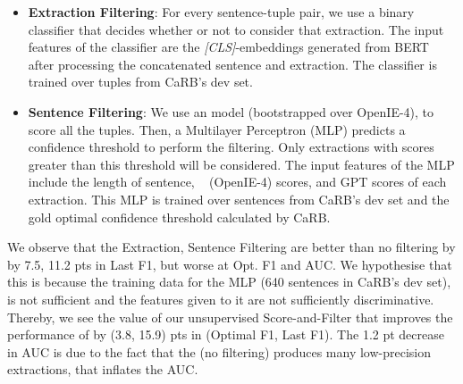        \begin{itemize}
            \item \textbf{Extraction Filtering}: For every sentence-tuple pair, we use a binary classifier that decides whether or not to consider that extraction. The input features of the classifier are the \textit{[CLS]}-embeddings generated from BERT after processing the concatenated sentence and extraction. The classifier is trained over tuples from CaRB's dev set.
            \item \textbf{Sentence Filtering}: We use an \shortname{} model (bootstrapped over OpenIE-4), to score all the tuples. Then, a Multilayer Perceptron (MLP) predicts a confidence threshold to perform the filtering. Only extractions with scores greater than this threshold will be considered. The input features of the MLP include the length of sentence, \shortname~ (OpenIE-4) scores, and GPT \cite{Radford2018-GPT} scores of each extraction. This MLP is trained over sentences from CaRB's dev set and the gold optimal confidence threshold calculated by CaRB. 
        \end{itemize}
        We observe that the Extraction, Sentence Filtering are better than no filtering by by 7.5, 11.2 pts in Last F1, but worse at Opt. F1 and AUC. We hypothesise that this is because the training data for the MLP (640 sentences in CaRB's dev set), is not sufficient and the features given to it are not sufficiently discriminative.
        Thereby, we see the value of our unsupervised Score-and-Filter that improves the performance of \shortname{} by (3.8, 15.9) pts in (Optimal F1, Last F1). The 1.2 pt decrease in AUC is due to the fact that the \shortname{} (no filtering) produces many low-precision extractions, that inflates the AUC.


